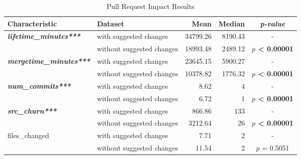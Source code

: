 \begin{table*}[tbh]
\centering
\caption{Pull Request Impact Results}
\begin{threeparttable}
\begin{tabular}{ |l|l|r|r|c| } \hline
  \textbf{Characteristic} & \textbf{Dataset} & \textbf{Mean} & \textbf{Median} & \textbf{\textit{p-value}} \\ \hline
 \multirow{2}{*}{\textbf{\em lifetime\_minutes***}} & with suggested changes & 34799.26 & 8190.43 & - \\
 & without suggested changes & 18993.48 & 2489.12 & \textbf{$p$ < 0.00001} \\ \hline
 \multirow{2}{*}{\textbf{\em mergetime\_minutes***}} 
 & with suggested changes & 23645.15 & 5900.27 & - \\
 & without suggested changes & 10378.82 & 1776.32 & \textbf{$p$ < 0.00001} \\ \hline
 \multirow{2}{*}{\textbf{\em num\_commits***}} 
 & with suggested changes & 8.62 & 4 & - \\
 & without suggested changes & 6.72 & 1 & \textbf{$p$ < 0.00001} \\ \hline
 \multirow{2}{*}{\textbf{\em src\_churn***}} & with suggested changes & 866.86 & 133 & - \\
 & without suggested changes & 3212.64 & 26 & \textbf{$p$ < 0.00001} \\ \hline
 \multirow{2}{*}{files\_changed}
 & with suggested changes & 7.71 & 2 & - \\
 & without suggested changes & 11.54 & 2 & $p$ = 0.5051 \\  \hline

\end{tabular}
\end{threeparttable}
\end{table*}
